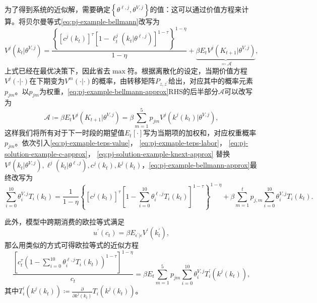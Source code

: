 为了得到系统的近似解，需要确定$\left\{ \theta^{\ell,j}, \theta^{V,j} \right\}$的值：这可以通过价值方程来计算。将贝尔曼等式\eqref{eq:pj-example-bellmann}改写为
\begin{equation}
  \label{eq:pj-example-bellmann-approx}
  V^{j} \left( k_{t} | \theta^{V,j} \right)
  = \frac{
  \left\{
  \left[ c^{j} \left(k_{t} \right) \right]^{\tau}
  \left[ 1 - \ell_{t}^{j} \left( k_{t} | \theta^{\ell,j} \right) \right]^{1 - \tau}
  \right\}^{1 - \eta}
  }{1-\eta}
  + \underbrace{
  \beta E_{t} V^{j} \left( K_{t+1} | \theta^{V,j} \right)
  }_{\eqqcolon \mathcal{A}}
  ,
\end{equation}
上式已经在最优决策下，因此省去$\max$符。根据离散化的设定，当期价值方程$V^{j}(\cdot | \cdot)$在下期变为$V^{m} (\cdot | \cdot)$的概率，由转移矩阵$P_{z,z^{'}}$给出，对应其中的概率元素$p_{jm}$。以$p_{jm}$为权重，\eqref{eq:pj-example-bellmann-approx}RHS的后半部分$\mathcal{A}$可以改写为
\begin{equation*}
  \mathcal{A} \coloneqq \beta E_{t} V^{j} \left( K_{t+1} | \theta^{V,j} \right)
  = \beta \sum_{m=1}^{5} p_{jm} V^{j} \left( k^{j}(k_{t}) | \theta^{V,j} \right),
\end{equation*}
这样我们将所有对于下一时段的期望值$E_{t} \left[ \cdot \right]$写为当期项的加权和，对应权重概率$p_{jm}$。依次引入\eqref{eq:pj-exmaple-teps-value}，
\eqref{eq:pj-exmaple-teps-labor}，
\eqref{eq:pj-solution-example-c-approx}， \eqref{eq:pj-solution-example-knext-approx} 替换
$V^{j} \left( k_{t} | \theta^{V,j} \right),
\ell^{j} \left( k_{t} | \theta^{\ell,j} \right),
c^{j} \left( k_{t} \right),
k^{j} \left( k_{t} \right)$，\eqref{eq:pj-example-bellmann-approx}最终改写为
\begin{equation}
  \label{eq:pj-example-bellman-approx-final}
  \sum_{i=0}^{10} \theta_{i}^{V,j} T_{i} \left( k_{t} \right)
  = \frac{1}{1-\eta}
  \left\{
  \left[
  c^{j} \left( k_{t} \right)
  \right]^{\tau}
  \left[
  1 - \sum_{i=0}^{10} \theta_{i}^{\ell, j} T_{i} \left( k_{t} \right)
  \right]^{1 - \tau}
  \right\}^{1 - \eta}
  + \beta \sum_{m=1}^{t} p_{j,m} \sum_{i=0}^{10} \theta_{i}^{V,j} T_{i} \left( k_{t} \right).
\end{equation}

此外，模型中跨期消费的欧拉等式满足
\begin{equation*}
  u^{'} \left( c_{t} \right) = \beta E_{\epsilon^{'} | \epsilon} V^{'} \left( k_{t}^{'}\right),
\end{equation*}
那么用类似的方式可得欧拉等式的近似方程
\begin{equation}
  \label{eq:pj-example-euler-approx-final}
  \frac{
  \left[
  c_{t}^{\tau}
  \left( 1 -
  \sum_{i=0}^{10} \theta_{i}^{\ell, j} T_{i} \left( k_{t} \right)
  \right)^{1 - \tau}
  \right]^{1-\eta}
  }{
  c_{t}
  }
  = \beta E_{t} \sum_{m=1}^{5} p_{jm}
  \sum_{i=0}^{10} \theta_{i}^{V,j}
  T_{i}^{'} \left( k^{j} \left( k_{t} \right) \right),
\end{equation}
其中$T_{i}^{'} \left( k^{j} \left( k_{t} \right) \right) \coloneqq \frac{\partial}{ \partial  k^{j} \left( k_{t} \right)} T_{i}\left( k^{j} \left( k_{t} \right) \right)$。

